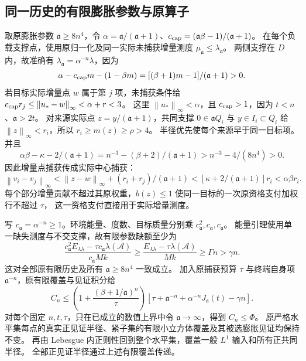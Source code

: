 \documentclass[UTF8,a4paper,11pt,fontset=fandol]{ctexart}
\theoremstyle{remark}
\newcommand{\norm}[1]{\left\lVert#1\right\rVert}
\begin{document}
\subsection{同一历史的有限膨胀参数与原算子}\label{subsec:actual-history}
取原膨胀参数 $\mathfrak a\ge8n^4$，令
$\alpha=\mathfrak a/(\mathfrak a+1)$、$c_{\rm cap}=(\mathfrak a\beta-1)/(\mathfrak a+1)$。
在每个负载支撑点，使用原归一化及同一实际未捕获增量测度 $\mu_{\mathfrak a}\le\lambda_{\mathfrak a}$。
两侧支撑在 $D$ 内，故准确有 $\lambda_{\mathfrak a}=\alpha^{-n}\lambda$，因为
\[
 \alpha-c_{\rm cap}m-(1-\beta m)=[(\beta+1)m-1]/(\mathfrak a+1)>0.
\]
若目标实际增量点 $w$ 属于第 $j$ 项，未捕获条件给
$c_{\rm cap}r_j\le\norm{u_*-w}_\infty<\alpha+r<3$。
这里 $\norm{u_*}_\infty<\alpha$，且 $c_{\rm cap}>1$，因为 $t<n$、$\mathfrak a>2t$。
对来源实际点 $z=y/(\mathfrak a+1)$，共同支撑 $0\in\mathfrak a Q_i$ 与 $y\in I_i\subset Q_i$
给 $\norm z_\infty<r_i$，所以 $r_i\ge m(z)\ge\rho>4$。
半径优先使每个来源早于同一目标项。
并且
\begin{equation}\label{eq:guard}
 \alpha\beta-\kappa-2/(\mathfrak a+1)
 =n^{-3}-(\beta+2)/(\mathfrak a+1)>n^{-3}-4/(8n^4)>0.
\end{equation}
因此增量点捕获传成实际中心捕获：
\[
 \norm{v_i-v_j}_\infty<\norm{z-w}_\infty+(r_i+r_j)/(\mathfrak a+1)
 <[\kappa+2/(\mathfrak a+1)]r_i<\alpha\beta r_i.
\]
每个部分增量贡献不超过其原权重，$b(z)\le1$ 使同一目标的一次原资格支付加权行不超过 $\tau$，
这一资格支付直接用于实际增量测度。

写 $c_{\mathfrak a}=\alpha^{-n}\ge1$。环境能量、度数、目标质量分别乘
$c_{\mathfrak a}^2,c_{\mathfrak a},c_{\mathfrak a}$。
能量引理使用单一缺失测度与不交支撑，故有限参数缺额至少为
\[
 \frac{c_{\mathfrak a}^2E_{\lambda\lambda}-\tau c_{\mathfrak a}\lambda(\mathcal A)}
      {c_{\mathfrak a}Mk}
 \ge\frac{E_{\lambda\lambda}-\tau\lambda(\mathcal A)}{Mk}
 \ge\Gamma n>\gamma n.
\]
这对全部原有限历史及所有 $\mathfrak a\ge8n^4$ 一致成立。
加入原捕获预算 $\tau$ 与终端自身项 $\mathfrak a^{-n}$，原有限覆盖与见证积分给
\[
 C_n\le\left(1+\frac{(\beta+1/\mathfrak a)^n}{\tau}\right)
 [\tau+\mathfrak a^{-n}+\alpha^{-n}J_{\mathfrak a}(t)-\gamma n].
\]
对每个固定 $n,t,\tau$，只在已成立的数值上界中令 $\mathfrak a\to\infty$，得到 $C_n\le\Phi$。
原严格水平集每点的真实正见证半径、紧子集的有限小立方体覆盖及其被选膨胀见证均保持不变。
再由 Lebesgue 内正则性回到整个水平集，覆盖一般 $L^1$ 输入和所有正共同半径。
全部正见证半径通过上述有限覆盖传递。
\end{document}
